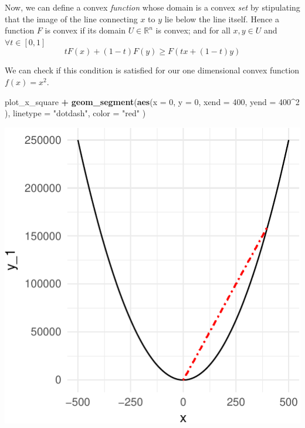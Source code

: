 \documentclass[11pt,]{article}
\newenvironment{Shaded}{\begin{snugshade}}{\end{snugshade}}
\newcommand{\KeywordTok}[1]{\textcolor[rgb]{0.13,0.29,0.53}{\textbf{#1}}}
\newcommand{\DataTypeTok}[1]{\textcolor[rgb]{0.13,0.29,0.53}{#1}}
\newcommand{\DecValTok}[1]{\textcolor[rgb]{0.00,0.00,0.81}{#1}}
\newcommand{\StringTok}[1]{\textcolor[rgb]{0.31,0.60,0.02}{#1}}
\newcommand{\OperatorTok}[1]{\textcolor[rgb]{0.81,0.36,0.00}{\textbf{#1}}}
\newcommand{\NormalTok}[1]{#1}
\begin{document}
Now, we can define a convex \emph{function} whose domain is a convex
\emph{set} by stipulating that the image of the line connecting \(x\) to
\(y\) lie below the line itself. Hence a function \(F\) is convex if its
domain \(U\in \mathbb{R}^n\) is convex; and for all \(x, y\in U\) and
\(\forall t\in[0,1]\) \[
tF(x) + (1-t)F(y) \geq F(tx + (1-t)y)
\]

We can check if this condition is satisfied for our one dimensional
convex function \(f(x)=x^2\).

\begin{Shaded}
\begin{Highlighting}[]
\NormalTok{plot_x_square }\OperatorTok{+}\StringTok{ }
\StringTok{  }\KeywordTok{geom_segment}\NormalTok{(}\KeywordTok{aes}\NormalTok{(}\DataTypeTok{x =} \DecValTok{0}\NormalTok{, }
                   \DataTypeTok{y =} \DecValTok{0}\NormalTok{, }
                   \DataTypeTok{xend =} \DecValTok{400}\NormalTok{, }
                   \DataTypeTok{yend =} \DecValTok{400}\OperatorTok{^}\DecValTok{2}
\NormalTok{                   ), }
               \DataTypeTok{linetype =} \StringTok{"dotdash"}\NormalTok{, }
               \DataTypeTok{color =} \StringTok{"red"}
\NormalTok{               )}
\end{Highlighting}
\end{Shaded}

\begin{center}\includegraphics{Optimization_files/figure-latex/func_convex-1} \end{center}
\end{document}
